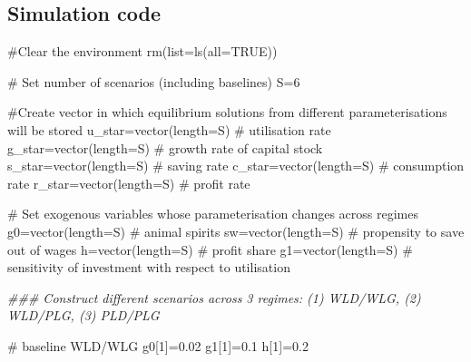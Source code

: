 \documentclass[
  letterpaper,
  DIV=11,
  numbers=noendperiod]{scrreprt}
\newenvironment{Shaded}{\begin{snugshade}}{\end{snugshade}}
\newcommand{\AttributeTok}[1]{\textcolor[rgb]{0.40,0.45,0.13}{#1}}
\newcommand{\CommentTok}[1]{\textcolor[rgb]{0.37,0.37,0.37}{#1}}
\newcommand{\ConstantTok}[1]{\textcolor[rgb]{0.56,0.35,0.01}{#1}}
\newcommand{\DecValTok}[1]{\textcolor[rgb]{0.68,0.00,0.00}{#1}}
\newcommand{\DocumentationTok}[1]{\textcolor[rgb]{0.37,0.37,0.37}{\textit{#1}}}
\newcommand{\FloatTok}[1]{\textcolor[rgb]{0.68,0.00,0.00}{#1}}
\newcommand{\FunctionTok}[1]{\textcolor[rgb]{0.28,0.35,0.67}{#1}}
\newcommand{\NormalTok}[1]{\textcolor[rgb]{0.00,0.23,0.31}{#1}}
\newcommand{\OtherTok}[1]{\textcolor[rgb]{0.00,0.23,0.31}{#1}}
\begin{document}
\subsection{Simulation code}\label{simulation-code-5}

\begin{Shaded}
\begin{Highlighting}[]
\CommentTok{\#Clear the environment}
\FunctionTok{rm}\NormalTok{(}\AttributeTok{list=}\FunctionTok{ls}\NormalTok{(}\AttributeTok{all=}\ConstantTok{TRUE}\NormalTok{))}

\CommentTok{\# Set number of scenarios (including baselines)}
\NormalTok{S}\OtherTok{=}\DecValTok{6}

\CommentTok{\#Create vector in which equilibrium solutions from different parameterisations will be stored}
\NormalTok{u\_star}\OtherTok{=}\FunctionTok{vector}\NormalTok{(}\AttributeTok{length=}\NormalTok{S) }\CommentTok{\# utilisation rate}
\NormalTok{g\_star}\OtherTok{=}\FunctionTok{vector}\NormalTok{(}\AttributeTok{length=}\NormalTok{S) }\CommentTok{\# growth rate of capital stock}
\NormalTok{s\_star}\OtherTok{=}\FunctionTok{vector}\NormalTok{(}\AttributeTok{length=}\NormalTok{S) }\CommentTok{\# saving rate}
\NormalTok{c\_star}\OtherTok{=}\FunctionTok{vector}\NormalTok{(}\AttributeTok{length=}\NormalTok{S) }\CommentTok{\# consumption rate}
\NormalTok{r\_star}\OtherTok{=}\FunctionTok{vector}\NormalTok{(}\AttributeTok{length=}\NormalTok{S) }\CommentTok{\# profit rate}

\CommentTok{\# Set exogenous variables whose parameterisation changes across regimes }
\NormalTok{g0}\OtherTok{=}\FunctionTok{vector}\NormalTok{(}\AttributeTok{length=}\NormalTok{S) }\CommentTok{\# animal spirits}
\NormalTok{sw}\OtherTok{=}\FunctionTok{vector}\NormalTok{(}\AttributeTok{length=}\NormalTok{S) }\CommentTok{\# propensity to save out of wages }
\NormalTok{h}\OtherTok{=}\FunctionTok{vector}\NormalTok{(}\AttributeTok{length=}\NormalTok{S)  }\CommentTok{\# profit share}
\NormalTok{g1}\OtherTok{=}\FunctionTok{vector}\NormalTok{(}\AttributeTok{length=}\NormalTok{S) }\CommentTok{\# sensitivity of investment with respect to utilisation}

\DocumentationTok{\#\#\# Construct different scenarios across 3 regimes: (1) WLD/WLG, (2) WLD/PLG, (3) PLD/PLG }

\CommentTok{\# baseline WLD/WLG}
\NormalTok{g0[}\DecValTok{1}\NormalTok{]}\OtherTok{=}\FloatTok{0.02}
\NormalTok{g1[}\DecValTok{1}\NormalTok{]}\OtherTok{=}\FloatTok{0.1}
\NormalTok{h[}\DecValTok{1}\NormalTok{]}\OtherTok{=}\FloatTok{0.2}


\end{Highlighting}
\end{Shaded}
\end{document}
